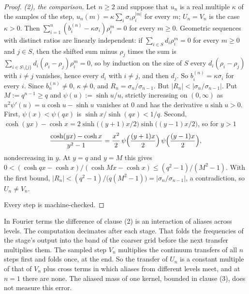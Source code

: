 \begin{proof}
\emph{(2), the comparison.} Let $n \ge 2$ and suppose that $u_n$ is a real multiple $\kappa$ of
the samples of the step, $u_n(m) = \kappa\sum_i\sigma_i\rho_i^{|m|}$ for every $m$; $U_n = V_n$ is
the case $\kappa > 0$. Then $\sum_{i=1}^n(b^{(n)}_i - \kappa\sigma_i)\rho_i^m = 0$ for every
$m \ge 0$. Geometric sequences with distinct ratios are linearly independent: if
$\sum_{i \in S}d_i\rho_i^m = 0$ for every $m \ge 0$ and $j \in S$, then the shifted sum minus
$\rho_j$ times the sum is $\sum_{i \in S \setminus \{j\}}d_i(\rho_i - \rho_j)\rho_i^m = 0$, so by
induction on the size of $S$ every $d_i(\rho_i - \rho_j)$ with $i \ne j$ vanishes, hence every
$d_i$ with $i \ne j$, and then $d_j$. So $b^{(n)}_i = \kappa\sigma_i$ for every $i$. Since
$b^{(n)}_n \ne 0$, $\kappa \ne 0$, and $R_n = \sigma_n/\sigma_{n-1}$. But
$|R_n| < |\sigma_n/\sigma_{n-1}|$. Put $M := q^{n-1} \ge q$ and $\psi(u) := \sinh u/u$, strictly
increasing on $(0,\infty)$ as $u^2\psi'(u) = u\cosh u - \sinh u$ vanishes at $0$ and has the
derivative $u\sinh u > 0$. First, $\psi(x) < \psi(qx)$ is $\sinh x/\sinh(qx) < 1/q$. Second,
$\cosh(yx) - \cosh x = 2\sinh\bigl((y+1)x/2\bigr)\sinh\bigl((y-1)x/2\bigr)$, so for $y > 1$
\[
  \frac{\cosh(yx) - \cosh x}{y^2 - 1}
  = \frac{x^2}{2}\,\psi\Bigl(\frac{(y+1)x}{2}\Bigr)\,\psi\Bigl(\frac{(y-1)x}{2}\Bigr) ,
\]
nondecreasing in $y$. At $y = q$ and $y = M$ this gives
$0 < (\cosh qx - \cosh x)/(\cosh Mx - \cosh x) \le (q^2 - 1)/(M^2 - 1)$. With the first bound,
$|R_n| < (q^2 - 1)/\bigl(q(M^2 - 1)\bigr) = |\sigma_n/\sigma_{n-1}|$, a contradiction, so
$U_n \ne V_n$.

Every step is machine-checked.
\end{proof}

In Fourier terms the difference of clause (2) is an interaction of aliases across levels. The
computation decimates after each stage. That folds the frequencies of the stage's output into the
band of the coarser grid before the next transfer multiplies them. The sampled step $V_n$ multiplies
the continuum transfers of all $n$ steps first and folds once, at the end. So the transfer of $U_n$
is a constant multiple of that of $V_n$ plus cross terms in which aliases from different levels
meet, and at $n = 1$ there are none. The aliased mass of one kernel, bounded in clause (3), does not
measure this error.

